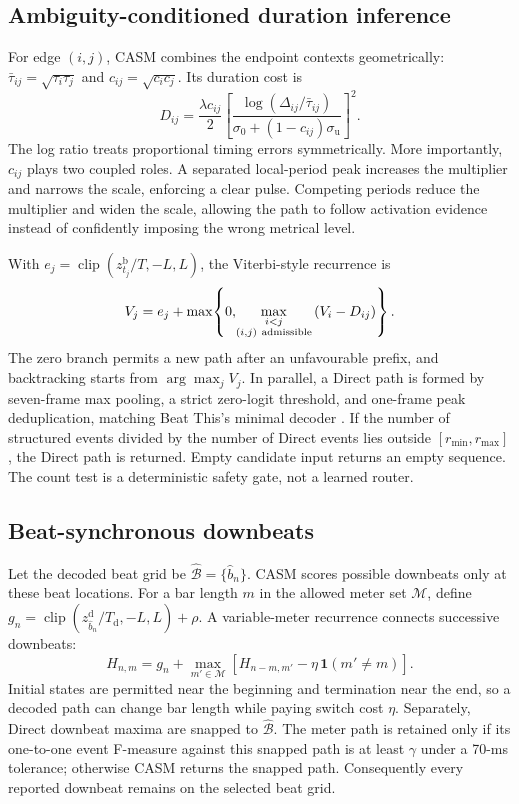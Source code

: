\documentclass{article}
\begin{document}
\subsection{Ambiguity-conditioned duration inference}

For edge $(i,j)$, CASM combines the endpoint contexts geometrically:
$\bar\tau_{ij}=\sqrt{\tau_i\tau_j}$ and
$c_{ij}=\sqrt{c_i c_j}$. Its duration cost is
\begin{equation}
D_{ij}=\frac{\lambda c_{ij}}{2}
\left[
\frac{\log(\Delta_{ij}/\bar\tau_{ij})}
{\sigma_0+(1-c_{ij})\sigma_{\mathrm u}}
\right]^2 .
\label{eq:casm-duration}
\end{equation}
The log ratio treats proportional timing errors symmetrically. More
importantly, $c_{ij}$ plays two coupled roles. A separated local-period peak
increases the multiplier and narrows the scale, enforcing a clear pulse.
Competing periods reduce the multiplier and widen the scale, allowing the path
to follow activation evidence instead of confidently imposing the wrong
metrical level.

With
$e_j=\operatorname{clip}(z^{\mathrm b}_{t_j}/T,-L,L)$, the Viterbi-style
recurrence is
\begin{equation}
V_j=e_j+\max\!\left\{0,\!
\max_{\substack{i<j\\(i,j)\ {\rm admissible}}}
\left(V_i-D_{ij}\right)\right\}.
\label{eq:casm-dp}
\end{equation}
The zero branch permits a new path after an unfavourable prefix, and
backtracking starts from $\arg\max_j V_j$. In parallel, a Direct path is
formed by seven-frame max pooling, a strict zero-logit threshold, and
one-frame peak deduplication, matching Beat This's minimal decoder
\cite{foscarin2024beat}. If the number of structured events divided by the
number of Direct events lies outside
$[r_{\min},r_{\max}]$, the Direct path is returned. Empty candidate input
returns an empty sequence. The count test is a deterministic safety gate, not
a learned router.

\subsection{Beat-synchronous downbeats}

Let the decoded beat grid be
$\widehat{\mathcal B}=\{\widehat b_n\}$. CASM scores possible downbeats only
at these beat locations. For a bar length $m$ in the allowed meter set
$\mathcal M$, define
$g_n=\operatorname{clip}(z^{\mathrm d}_{\widehat b_n}/T_{\mathrm d},-L,L)
+\rho$. A variable-meter recurrence connects successive downbeats:
\begin{equation}
H_{n,m}=g_n+\max_{m'\in\mathcal M}
\left[H_{n-m,m'}-\eta\,\mathbf 1(m'\ne m)\right].
\label{eq:casm-meter}
\end{equation}
Initial states are permitted near the beginning and termination near the end,
so a decoded path can change bar length while paying switch cost $\eta$.
Separately, Direct downbeat maxima are snapped to
$\widehat{\mathcal B}$. The meter path is retained only if its one-to-one
event F-measure against this snapped path is at least $\gamma$ under a 70-ms
tolerance; otherwise CASM returns the snapped path. Consequently every
reported downbeat remains on the selected beat grid.
\end{document}
